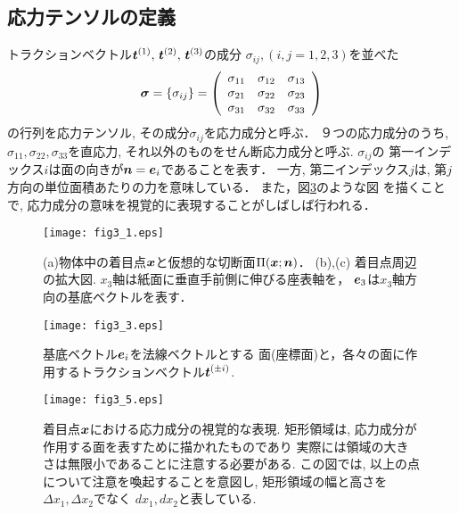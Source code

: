 \documentclass[10pt,a4j]{jbook}
\begin{document}
\subsection{応力テンソルの定義}
トラクションベクトル$\mbox{\boldmath $t$}^{(1)},\, \mbox{\boldmath $t$}^{(2)},\,\mbox{\boldmath $t$}^{(3)}$の成分
$\sigma_{ij},(i,j=1,2,3)$を並べた
\begin{equation}
	\mbox{\boldmath $\sigma$}=\left\{ \sigma_{ij}\right\}
	=\left(
	\begin{array}{ccc}
		\sigma_{11} & \sigma_{12} & \sigma_{13} \\
		\sigma_{21} & \sigma_{22} & \sigma_{23} \\
		\sigma_{31} & \sigma_{32} & \sigma_{33} 
	\end{array}
	\right)
\end{equation}
の行列を応力テンソル, その成分$\sigma_{ij}$を応力成分と呼ぶ．
９つの応力成分のうち, $\sigma_{11},\sigma_{22},\sigma_{33}$を直応力, 
それ以外のものをせん断応力成分と呼ぶ. $\sigma_{ij}$の
第一インデックス$i$は面の向きが$\mbox{\boldmath $n$}=\mbox{\boldmath $e$}_i$であることを表す．
一方, 第二インデックス$j$は, 第$j$方向の単位面積あたりの力を意味している．
また，図\ref{fig:fig3_5}のような図
を描くことで, 応力成分の意味を視覚的に表現することがしばしば行われる．
\begin{figure}[h]
	\begin{center}
	\texttt{[image: fig3\_1.eps]} 
	\end{center}
	\caption{(a)物体中の着目点$\mbox{\boldmath $x$}$と仮想的な切断面$\Pi(\mbox{\boldmath $x$};\mbox{\boldmath $n$})$．
	(b),(c) 着目点周辺の拡大図.
	$x_3$軸は紙面に垂直手前側に伸びる座表軸を，
	$\mbox{\boldmath $e$}_3$は$x_3$軸方向の基底ベクトルを表す．} 
	\label{fig:fig3_1}
\end{figure}
\begin{figure}[h]
	\begin{center}
	\texttt{[image: fig3\_3.eps]} 
	\end{center}
	\caption{基底ベクトル$\mbox{\boldmath $e$}_i$を法線ベクトルとする
	面(座標面)と，各々の面に作用するトラクションベクトル$\mbox{\boldmath $t$}^{(\pm i)}$.}
	\label{fig:fig3_3}
\end{figure}
\begin{figure}[h]
	\begin{center}
	\texttt{[image: fig3\_5.eps]} 
	\end{center}
	\caption{着目点$\mbox{\boldmath $x$}$における応力成分の視覚的な表現.
	矩形領域は, 応力成分が作用する面を表すために描かれたものであり
	実際には領域の大きさは無限小であることに注意する必要がある.
	この図では, 以上の点について注意を喚起することを意図し, 
	矩形領域の幅と高さを$\Delta x_1, \Delta x_2$でなく
	$dx_1, dx_2$と表している. }
	\label{fig:fig3_5}
\end{figure}
\end{document}
